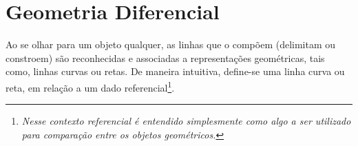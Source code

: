 ﻿\chapter[GEOMETRIA DIFERENCIAL]{Geometria Diferencial}
\label{capII}


Ao se olhar para um objeto qualquer, as linhas que o compõem (delimitam ou constroem) são reconhecidas e associadas a representações geométricas, tais como, linhas curvas ou retas. De maneira intuitiva, define-se uma linha curva ou reta, em relação a um dado referencial\footnote{\textsl{Nesse contexto referencial é entendido simplesmente como algo a ser utilizado para comparação entre os objetos geométricos.}}.

